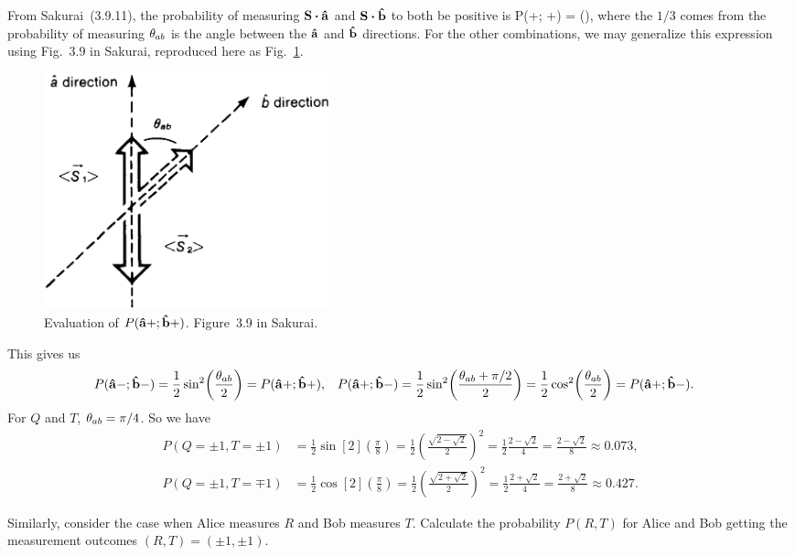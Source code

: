 \begin{solution}
	From Sakurai~(3.9.11), the probability of measuring $\vS \vdot \ah$ and $\vS \vdot \bh$ to both be positive is
	\beq
		P(\ah+; \bh+) =  \sin[2](),
	\eeq
	where the $1/3$ comes from the probability of measuring $\theta_{ab}$ is the angle between the $\vb{\hat{a}}$ and $\vb{\hat{b}}$ directions.  For the other combinations, we may generalize this expression using Fig.~3.9 in Sakurai, reproduced here as Fig.~\ref{sakurai}.
	
	\begin{figure} \centering
		\includegraphics[width=0.4\textwidth]{3-9.jpg}
		\caption{Evaluation of $P(\vb{\hat{a}}+; \vb{\hat{b}}+)$.  Figure~3.9 in Sakurai.}
		\label{sakurai}
	\end{figure}

	This gives us
	\begin{align} \label{probs}
		P(\vb{\hat{a}}-; \vb{\hat{b}}-) &= \frac{1}{2} \sin[2](\frac{\theta_{ab}}{2}) = P(\vb{\hat{a}}+; \vb{\hat{b}}+), &
		P(\vb{\hat{a}}+; \vb{\hat{b}}-) &= \frac{1}{2} \sin[2](\frac{\theta_{ab} + \pi/2}{2}) = \frac{1}{2} \cos[2](\frac{\theta_{ab}}{2}) = P(\vb{\hat{a}}+; \vb{\hat{b}}-).
	\end{align}
	For $Q$ and $T$, $\theta_{ab} = \pi / 4$.  So we have
	\begin{align*}
		P(Q=\pm1, T=\pm1) &= \frac{1}{2} \sin[2](\frac{\pi}{8})
		= \frac{1}{2} \left( \frac{\sqrt{2 - \sqrt{2}}}{2} \right)^2
		= \frac{1}{2} \frac{2 - \sqrt{2}}{4}
		= \frac{2 - \sqrt{2}}{8}
		\approx 0.073, \\
		P(Q=\pm1, T=\mp1) &= \frac{1}{2} \cos[2](\frac{\pi}{8})
		= \frac{1}{2} \left( \frac{\sqrt{2 + \sqrt{2}}}{2} \right)^2
		= \frac{1}{2} \frac{2 + \sqrt{2}}{4}
		= \frac{2 + \sqrt{2}}{8}
		\approx 0.427.
	\end{align*}
	\vfix
\end{solution}



\newcommand{\kRp}{\ket{R_+}}
\newcommand{\kRm}{\ket{R_-}}
\newcommand{\kSp}{\ket{S_+}}
\newcommand{\kSm}{\ket{S_-}}

\begin{problem}
	Similarly, consider the case when Alice measures $R$ and Bob measures $T$.  Calculate the probability $P(R, T)$ for Alice and Bob getting the measurement outcomes $(R, T) = (\pm1, \pm1)$.
\end{problem}

